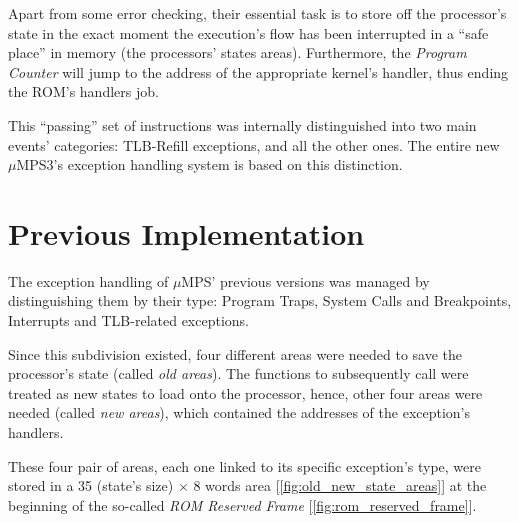 \documentclass[12pt,a4paper,openright,twoside]{report}
\begin{document}
Apart from some error checking, their essential task is to store off the processor's state in the exact moment the execution's flow has been interrupted in a ``safe place'' in memory (the processors' states areas).
Furthermore, the \textit{Program Counter} will jump to the address of the appropriate kernel's handler, thus ending the ROM's handlers job.

This ``passing'' set of instructions was internally distinguished into two main events' categories: TLB-Refill exceptions, and all the other ones.
The entire new $\mu$MPS3's exception handling system is based on this distinction.

\section{Previous Implementation}
The exception handling of $\mu$MPS' previous versions was managed by distinguishing them by their type: Program Traps, System Calls and Breakpoints, Interrupts and TLB-related exceptions.

Since this subdivision existed, four different areas were needed to save the processor's state (called \textit{old areas}).
The functions to subsequently call were treated as new states to load onto the processor, hence, other four areas were needed (called \textit{new areas}), which contained the addresses of the exception's handlers.

These four pair of areas, each one linked to its specific exception's type, were stored in a 35 (state's size) $\times$ 8 words area [\autoref{fig:old_new_state_areas}] at the beginning of the so-called \textit{ROM Reserved Frame} [\autoref{fig:rom_reserved_frame}].
\end{document}
